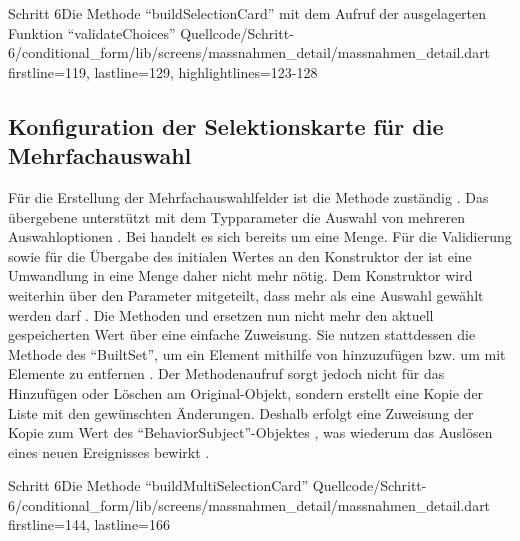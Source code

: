 \begin{alexlisting}{Schritt 6}{Die Methode \enquote{buildSelectionCard} mit dem Aufruf der ausgelagerten Funktion \enquote{validateChoices}}
  {Quellcode/Schritt-6/conditional_form/lib/screens/massnahmen_detail/massnahmen_detail.dart}
  {firstline=119, lastline=129, highlightlines={123-128}}
  \label{lst:Schritt6buildSelectionCard}
\end{alexlisting}


\subsection{Konfiguration der Selektionskarte für die Mehrfachauswahl} 


Für die Erstellung der Mehrfachauswahlfelder ist die Methode  zuständig \Lst{\ref{lst:Schritt6buildMultiSelectionCard}}.
Das übergebene  unterstützt mit dem Typparameter  die Auswahl von mehreren Auswahloptionen .
Bei  handelt es sich bereits um eine Menge.
Für die Validierung  sowie für die Übergabe des initialen Wertes an den Konstruktor der   ist eine Umwandlung in eine Menge daher nicht mehr nötig.
Dem Konstruktor  wird weiterhin über den Parameter  mitgeteilt, dass mehr als eine Auswahl gewählt werden darf .
Die Methoden  und  ersetzen nun nicht mehr den aktuell gespeicherten Wert über eine einfache Zuweisung.
Sie nutzen stattdessen die Methode  des \enquote{BuiltSet}, um ein Element mithilfe von  hinzuzufügen  bzw. um mit  Elemente zu entfernen .
Der Methodenaufruf  sorgt jedoch nicht für das Hinzufügen oder Löschen am Original-Objekt, sondern erstellt eine Kopie der Liste mit den gewünschten Änderungen.
Deshalb erfolgt eine Zuweisung der Kopie zum Wert des \enquote{BehaviorSubject}-Objektes , was wiederum das Auslösen eines neuen Ereignisses bewirkt .

\begin{alexlisting}{Schritt 6}{Die Methode \enquote{buildMultiSelectionCard}}
  {Quellcode/Schritt-6/conditional_form/lib/screens/massnahmen_detail/massnahmen_detail.dart}
  {firstline=144, lastline=166}
  \label{lst:Schritt6buildMultiSelectionCard}
\end{alexlisting}